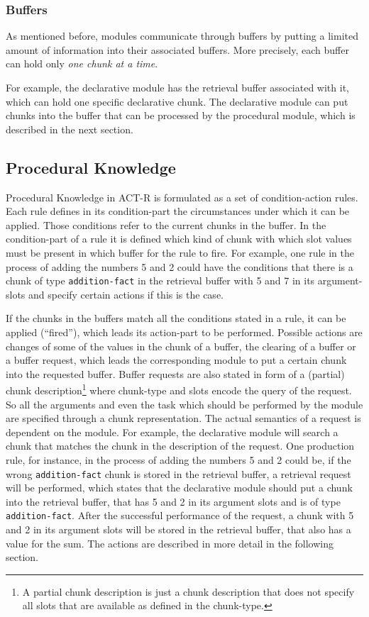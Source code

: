 \subsubsection{Buffers}

As mentioned before, modules communicate through buffers by putting a limited amount of information into their associated buffers. More precisely, each buffer can hold only \emph{one chunk at a time}.

For example, the declarative module has the retrieval buffer associated with it, which can hold one specific declarative chunk. The declarative module can put chunks into the buffer that can be processed by the procedural module, which is described in the next section.

\subsection{Procedural Knowledge}
\label{procedural_knowledge}

Procedural Knowledge in ACT-R is formulated as a set of condition-action rules. Each rule defines in its condition-part the circumstances under which it can be applied. Those conditions refer to the current chunks in the buffer. In the condition-part of a rule it is defined which kind of chunk with which slot values must be present in which buffer for the rule to fire. For example, one rule in the process of adding the numbers 5 and 2 could have the conditions that there is a chunk of type \verb|addition-fact| in the retrieval buffer with 5 and 7 in its argument-slots and specify certain actions if this is the case.

If the chunks in the buffers match all the conditions stated in a rule, it can be applied (``fired''), which leads its action-part to be performed. Possible actions are changes of some of the values in the chunk of a buffer, the clearing of a buffer or a buffer request, which leads the corresponding module to put a certain chunk into the requested buffer. Buffer requests are also stated in form of a (partial) chunk description\footnote{A partial chunk description is just a chunk description that does not specify all slots that are available as defined in the chunk-type.} where chunk-type and slots encode the query of the request. So all the arguments and even the task which should be performed by the module are specified through a chunk representation. The actual semantics of a request is dependent on the module. For example, the declarative module will search a chunk that matches the chunk in the description of the request. One production rule, for instance, in the process of adding the numbers 5 and 2 could be, if the wrong \verb|addition-fact| chunk is stored in the retrieval buffer, a retrieval request will be performed, which states that the declarative module should put a chunk into the retrieval buffer, that has 5 and 2 in its argument slots and is of type \verb|addition-fact|. After the successful performance of the request, a chunk with 5 and 2 in its argument slots will be stored in the retrieval buffer, that also has a value for the sum. The actions are described in more detail in the following section.

